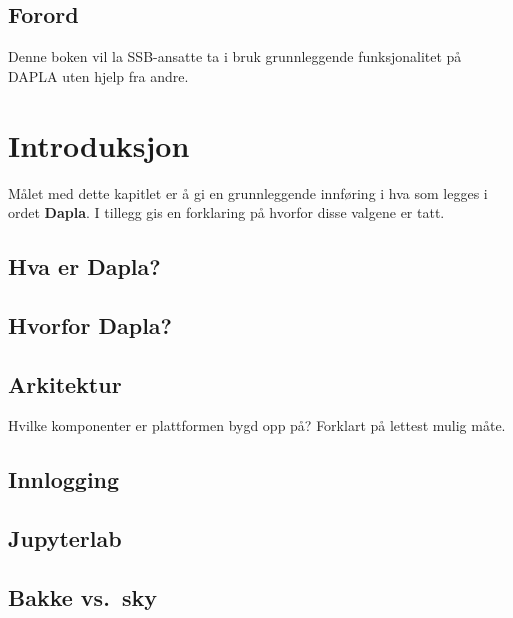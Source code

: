 \documentclass[
  letterpaper,
  DIV=11,
  numbers=noendperiod]{scrreprt}
\begin{document}

\hypertarget{forord}{%
\chapter*{Forord}\label{forord}}

Denne boken vil la SSB-ansatte ta i bruk grunnleggende funksjonalitet på
DAPLA uten hjelp fra andre.

\part{Introduksjon}

Målet med dette kapitlet er å gi en grunnleggende innføring i hva som
legges i ordet \textbf{Dapla}. I tillegg gis en forklaring på hvorfor
disse valgene er tatt.

\hypertarget{hva-er-dapla}{%
\chapter{Hva er Dapla?}\label{hva-er-dapla}}

\hypertarget{hvorfor-dapla}{%
\chapter{Hvorfor Dapla?}\label{hvorfor-dapla}}

\hypertarget{arkitektur}{%
\chapter{Arkitektur}\label{arkitektur}}

Hvilke komponenter er plattformen bygd opp på? Forklart på lettest mulig
måte.

\hypertarget{innlogging}{%
\chapter{Innlogging}\label{innlogging}}

\hypertarget{jupyterlab}{%
\chapter{Jupyterlab}\label{jupyterlab}}

\hypertarget{bakke-vs.-sky}{%
\chapter{Bakke vs.~sky}\label{bakke-vs.-sky}}
\end{document}
